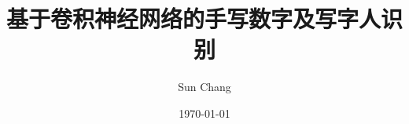 \documentclass[UTF8, twoside, 12pt]{ctexart}
\numberwithin{equation}{section}
\begin{document}
\title{基于卷积神经网络的手写数字及写字人识别}
\author{Sun Chang}
\date{\today}

\newcommand{\authorname}{Your name}
\newcommand{\school}{Your school}
\newcommand{\major}{Your major}
\newcommand{\studentid}{Your student id}
\newcommand{\tutor}{Your tutor}
\newcommand{\submitdate}{2024年\ 05月\ 00日}












\printbibliography[title={参考文献}]
\newpage


\end{document}
